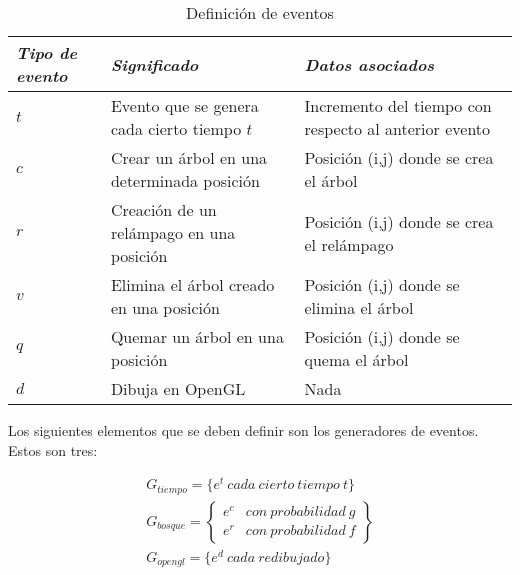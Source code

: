 \documentclass{egpubl}
\begin{document}
\begin{table}[h]
\begin{center}
\begin{small}
\begin{tabular}{|p{1cm}|p{2.6cm}|p{2.6cm}|}

	\hline
	\itshape Tipo de evento &
	\itshape Significado & 
	\itshape Datos asociados\\

	\hline
	$t$ & 
	Evento que se genera cada cierto tiempo $t$ & 
	Incremento del tiempo con respecto al anterior evento\\

	\hline
	$c$ &
	Crear un \'arbol en una determinada posici\'on &
	Posici\'on (i,j) donde se crea el \'arbol \\

	\hline
	$r$ &
	Creaci\'on de un rel\'ampago en una posici\'on &
	Posici\'on (i,j) donde se crea el rel\'ampago\\

	\hline
	$v$ &
	Elimina el \'arbol creado en una posici\'on &
	Posici\'on (i,j) donde se elimina el \'arbol\\

	\hline
	$q$ &
	Quemar un \'arbol en una posici\'on &
	Posici\'on (i,j) donde se quema el \'arbol\\

	\hline
	$d$ &
	Dibuja en OpenGL &
	Nada\\

	\hline

\end{tabular}
\end{small}
\caption{\label{table1} Definici\'on de eventos}
\end{center}
\end{table}



Los siguientes elementos que se deben definir son los generadores de
eventos. Estos son tres:

\[\begin{array}{c}
	G_{\mathit{tiempo}} = \{e^{t}\ \mathit{cada \ cierto \ tiempo \ t}\}\\

	G_{\mathit{bosque}} = \left\{
		\begin{matrix}
			e^{c} & \mathit{con \ probabilidad \ g}\\
			e^{r} & \mathit{con \ probabilidad \ f}
		\end{matrix}\right\}\\

	G_{\mathit{opengl}} = \{e^{d}\ \mathit{cada \ redibujado}\}
\end{array}\]
\end{document}
